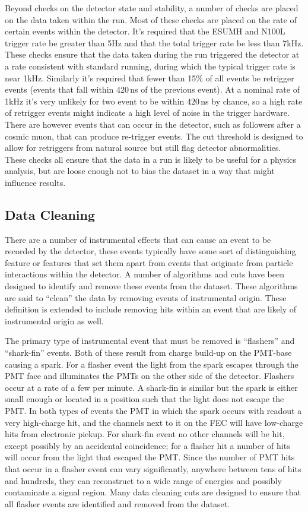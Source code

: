 Beyond checks on the detector state and stability, a number of checks
are placed on the data taken within the run.
Most of these checks are placed on the rate of certain events within the detector.
It's required that the ESUMH and N100L trigger rate be greater than 5Hz and
that the total trigger rate be less than 7kHz.
These checks ensure that the data taken during the run triggered the detector
at a rate consistent with standard running, during which the typical trigger
rate is near 1kHz.
Similarly it's required that fewer than 15\% of all events be retrigger events
(events that fall within 420\,ns of the previous event).
At a nominal rate of 1kHz it's very unlikely for two event to be within $420$\,ns
by chance, so a high rate of retrigger events might indicate a high level
of noise in the trigger hardware. There are however events that can occur
in the detector, such as followers after a cosmic muon, that can produce
re-trigger events.
The cut threshold is designed to allow for retriggers from natural source but
still flag detector abnormalities.
These checks all ensure that the data in a run is likely to be useful for
a physics analysis, but are loose enough not to bias the dataset in a way that
might influence results.
\subsection{Data Cleaning}
There are a number of instrumental effects that can cause an event
to be recorded by the detector, these events typically have some
sort of distinguishing feature or features that set them apart
from events that originate from particle interactions within the
detector.
A number of algorithms and cuts have been designed to identify and remove
these events from the dataset.
These algorithms are said to ``clean'' the data by removing events
of instrumental origin. These definition is extended to include removing
hits within an event that are likely of instrumental origin as well.

The primary type of instrumental event that must be removed is ``flashers'' and
``shark-fin'' events.
Both of these result from charge build-up on the PMT-base causing a
spark.
For a flasher event the light from the spark escapes through the PMT face
and illuminates the PMTs on the other side of the detector.
Flashers occur at a rate of a few per minute.
A shark-fin is similar but the spark is either small enough or located
in a position such that the light does not escape the PMT.\@
In both types of events the PMT in which the spark occurs with readout
a very high-charge hit, and the channels next to it on the FEC will
have low-charge hits from electronic pickup.
For shark-fin event no other channels will be hit, except possibly by an
accidental coincidence; for a flasher hit a number of hits will
occur from the light that escaped the PMT.\@
Since the number of PMT hits that occur in a flasher event can vary significantly,
anywhere between tens of hits and hundreds, they can reconstruct
to a wide range of energies and possibly contaminate a signal region.
Many data cleaning cuts are designed to ensure that all
flasher events are identified and removed from the dataset.

